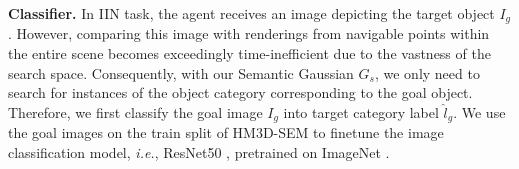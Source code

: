 
\textbf{Classifier.} In IIN task, the agent receives an image depicting the target object $I_g$. However, comparing this image with renderings from navigable points within the entire scene becomes exceedingly time-inefficient due to the vastness of the search space. Consequently, with our Semantic Gaussian $G_s$, we only need to search for instances of the object category corresponding to the goal object. Therefore, we first classify the goal image $I_g$ into target category label $\hat{l}_g$. We use the goal images on the train split of HM3D-SEM \cite{yadav2023habitat} to finetune the image classification model, \textit{i.e.}, ResNet50 \cite{He2015}, pretrained on ImageNet \cite{5206848}. 


